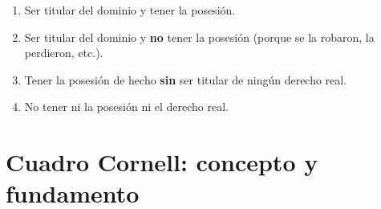 \documentclass[12pt,oneside]{book}
\begin{document}
\begin{enumerate}[label=\alph*)]
    \item Ser titular del dominio y tener la posesión.
    \item Ser titular del dominio y \textbf{no} tener la posesión (porque se la robaron, la perdieron, etc.).
    \item Tener la posesión de hecho \textbf{sin} ser titular de ningún derecho real.
    \item No tener ni la posesión ni el derecho real.
\end{enumerate}

\section*{Cuadro Cornell: concepto y fundamento}
\end{document}
